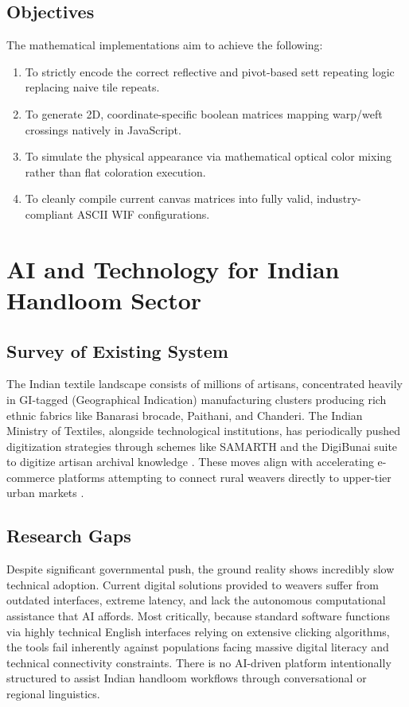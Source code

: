\subsection{Objectives}
The mathematical implementations aim to achieve the following:
\begin{enumerate}
    \item To strictly encode the correct reflective and pivot-based sett repeating logic replacing naive tile repeats.
    \item To generate 2D, coordinate-specific boolean matrices mapping warp/weft crossings natively in JavaScript.
    \item To simulate the physical appearance via mathematical optical color mixing rather than flat coloration execution.
    \item To cleanly compile current canvas matrices into fully valid, industry-compliant ASCII WIF configurations.
\end{enumerate}

\section{AI and Technology for Indian Handloom Sector}

\subsection{Survey of Existing System}
The Indian textile landscape consists of millions of artisans, concentrated heavily in GI-tagged (Geographical Indication) manufacturing clusters producing rich ethnic fabrics like Banarasi brocade, Paithani, and Chanderi. The Indian Ministry of Textiles, alongside technological institutions, has periodically pushed digitization strategies through schemes like SAMARTH and the DigiBunai suite to digitize artisan archival knowledge \cite{ref11}. These moves align with accelerating e-commerce platforms attempting to connect rural weavers directly to upper-tier urban markets \cite{ref12}.

\subsection{Research Gaps}
Despite significant governmental push, the ground reality shows incredibly slow technical adoption. Current digital solutions provided to weavers suffer from outdated interfaces, extreme latency, and lack the autonomous computational assistance that AI affords. Most critically, because standard software functions via highly technical English interfaces relying on extensive clicking algorithms, the tools fail inherently against populations facing massive digital literacy and technical connectivity constraints. There is no AI-driven platform intentionally structured to assist Indian handloom workflows through conversational or regional linguistics.

